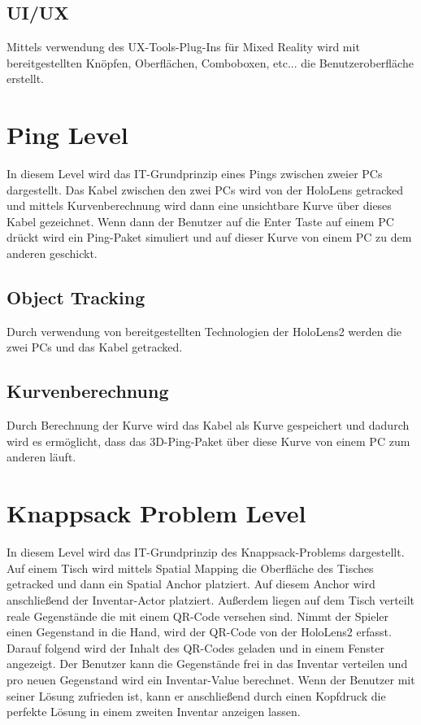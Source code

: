 \subsection{UI/UX}
Mittels verwendung des UX-Tools-Plug-Ins für Mixed Reality wird
mit bereitgestellten Knöpfen, Oberflächen, Comboboxen, etc...
die Benutzeroberfläche erstellt.

\section{Ping Level}
In diesem Level wird das IT-Grundprinzip eines Pings zwischen zweier
PCs dargestellt. Das Kabel zwischen den zwei PCs wird von der
HoloLens getracked und mittels Kurvenberechnung wird dann eine
unsichtbare Kurve über dieses Kabel gezeichnet. Wenn dann der Benutzer
auf die Enter Taste auf einem PC drückt wird ein Ping-Paket simuliert
und auf dieser Kurve von einem PC zu dem anderen geschickt.

\subsection{Object Tracking}
Durch verwendung von bereitgestellten Technologien der HoloLens2
werden die zwei PCs und das Kabel getracked.

\subsection{Kurvenberechnung}
Durch Berechnung der Kurve wird das Kabel als Kurve gespeichert
und dadurch wird es ermöglicht, dass das 3D-Ping-Paket über diese
Kurve von einem PC zum anderen läuft.

\section{Knappsack Problem Level}
In diesem Level wird das IT-Grundprinzip des Knappsack-Problems dargestellt.
Auf einem Tisch wird mittels Spatial Mapping die Oberfläche des Tisches
getracked und dann ein Spatial Anchor platziert. Auf diesem Anchor wird
anschließend der Inventar-Actor platziert. Außerdem liegen auf dem Tisch
verteilt reale Gegenstände die mit einem QR-Code versehen sind. Nimmt der
Spieler einen Gegenstand in die Hand, wird der QR-Code von der HoloLens2
erfasst. Darauf folgend wird der Inhalt des QR-Codes geladen und in einem
Fenster angezeigt. Der Benutzer kann die Gegenstände frei in das Inventar
verteilen und pro neuen Gegenstand wird ein Inventar-Value berechnet.
Wenn der Benutzer mit seiner Lösung zufrieden ist, kann er anschließend
durch einen Kopfdruck die perfekte Lösung in einem zweiten Inventar anzeigen
lassen.

